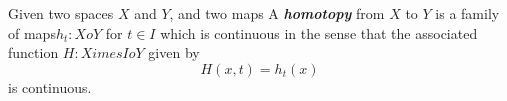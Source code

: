 \documentclass[preview]{standalone}
\begin{document}
\begin{center}
Given two spaces $X$ and $Y$, and two maps A \textbf{\textit{homotopy}} from $X$ to $Y$ is a family of maps$h_t : X 	o Y$ for $t \in I$ which is continuous in the sense that the associated function $H : X 	imes I 	o Y$ given by $$H(x,t) = h_t(x)$$ is continuous.
\end{center}
\end{document}

